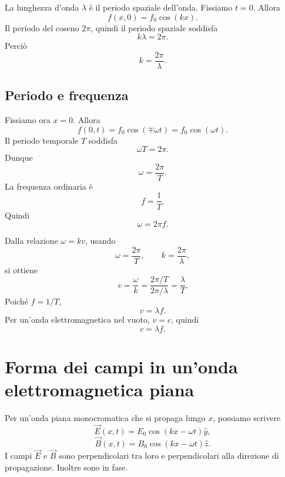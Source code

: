 \documentclass[a4paper]{article}
\begin{document}
La lunghezza d'onda \(\lambda\) è il periodo spaziale dell'onda. Fissiamo \(t=0\). Allora
\[
f(x,0)=f_0\cos(kx).
\]
Il periodo del coseno  \(2\pi\), quindi il periodo spaziale soddisfa
\[
k\lambda=2\pi.
\]
Perciò
\[
k=\frac{2\pi}{\lambda}.
\]

\begin{center}
\end{center}

\subsection{Periodo e frequenza}

Fissiamo ora \(x=0\). Allora
\[
f(0,t)=f_0\cos(\mp\omega t)=f_0\cos(\omega t).
\]
Il periodo temporale \(T\) soddisfa
\[
\omega T=2\pi.
\]
Dunque
\[
\omega=\frac{2\pi}{T}.
\]
La frequenza ordinaria è
\[
f=\frac{1}{T}.
\]
Quindi
\[
\omega=2\pi f.
\]

\begin{center}
\end{center}

Dalla relazione \(\omega=kv\), usando
\[
\omega=\frac{2\pi}{T},
\qquad
k=\frac{2\pi}{\lambda},
\]
si ottiene
\[
v=\frac{\omega}{k}=\frac{2\pi/T}{2\pi/\lambda}=\frac{\lambda}{T}.
\]
Poiché \(f=1/T\),
\[
v=\lambda f.
\]
Per un'onda elettromagnetica nel vuoto, \(v=c\), quindi
\[
c=\lambda f.
\]

\section{Forma dei campi in un'onda elettromagnetica piana}

Per un'onda piana monocromatica che si propaga lungo \(x\), possiamo scrivere
\[
\vec{E}(x,t)=E_0\cos(kx-\omega t)\hat{y},
\]
\[
\vec{B}(x,t)=B_0\cos(kx-\omega t)\hat{z}.
\]
I campi \(\vec{E}\) e \(\vec{B}\) sono perpendicolari tra loro e perpendicolari alla direzione di propagazione. Inoltre sono in fase.
\end{document}
